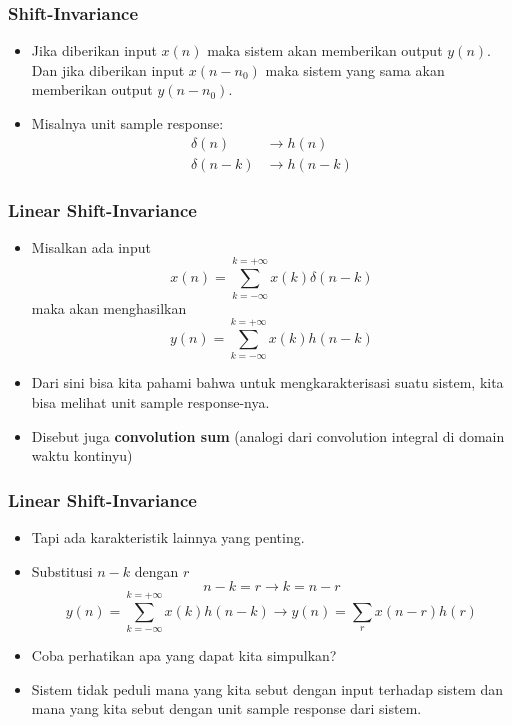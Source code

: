 \documentclass[pdflatex,compress]{beamer}
\begin{document}
\begin{frame}
	\frametitle{Shift-Invariance}
	\begin{itemize}
		\item Jika diberikan input $ x(n) $ maka sistem akan memberikan output $ y(n) $. Dan jika diberikan input $ x(n-n_0) $ maka sistem yang sama akan memberikan output $ y(n-n_0) $.
		\item Misalnya unit sample response:
		\begin{align*}
			\delta(n) &\rightarrow h(n) \\
			\delta(n-k) &\rightarrow h(n-k)
		\end{align*}
	\end{itemize}
\end{frame}

\begin{frame}
	\frametitle{Linear Shift-Invariance}
	\begin{itemize}
		\item Misalkan ada input \[ x(n) = \sum_{k = -\infty}^{k = +\infty} x(k)\delta(n-k) \]
		maka akan menghasilkan \[ y(n) = \sum_{k = -\infty}^{k = +\infty} x(k)h(n-k) \]
		\item Dari sini bisa kita pahami bahwa untuk mengkarakterisasi suatu sistem, kita bisa melihat unit sample response-nya.
		\item Disebut juga \textbf{convolution sum} (analogi dari convolution  integral di domain waktu kontinyu)
	\end{itemize}
\end{frame}

\begin{frame}
	\frametitle{Linear Shift-Invariance}
	\begin{itemize}
		\item<1-> Tapi ada karakteristik lainnya yang penting.
		\item<2-> Substitusi $ n - k $ dengan $ r $
		\[ n-k = r \rightarrow k = n-r\]
		\[ y(n) = \sum_{k = -\infty}^{k = +\infty} x(k)h(n-k) \rightarrow y(n) = \sum_r x(n-r)h(r) \]
		\item<3-> Coba perhatikan apa yang dapat kita simpulkan?
		\item<4-> Sistem tidak peduli mana yang kita sebut dengan input terhadap sistem dan mana yang kita sebut dengan unit sample response dari sistem.
	\end{itemize}
\end{frame}
\end{document}
